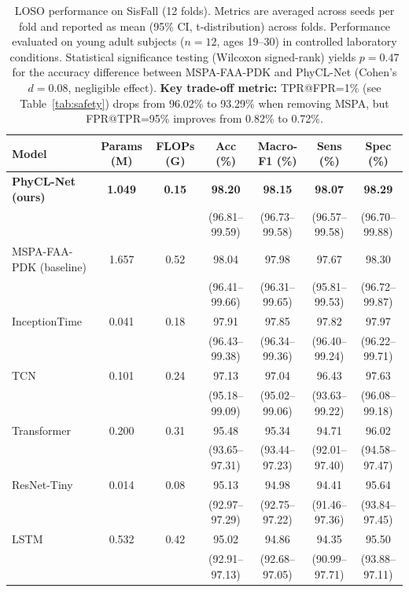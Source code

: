 \documentclass{article}
\begin{document}
\begin{table}[htbp]
\caption{LOSO performance on SisFall (12 folds). Metrics are averaged across seeds per fold and reported as mean (95\% CI, t-distribution) across folds. Performance evaluated on young adult subjects ($n=12$, ages 19--30) in controlled laboratory conditions. Statistical significance testing (Wilcoxon signed-rank) yields $p=0.47$ for the accuracy difference between MSPA-FAA-PDK and PhyCL-Net (Cohen's $d=0.08$, negligible effect). \textbf{Key trade-off metric:} TPR@FPR=1\% (see Table~\ref{tab:safety}) drops from 96.02\% to 93.29\% when removing MSPA, but FPR@TPR=95\% improves from 0.82\% to 0.72\%.}
\label{tab:main_results}
\centering
\small
\begin{tabular}{lcccccc}
\toprule
Model & Params (M) & FLOPs (G) & Acc (\%) & Macro-F1 (\%) & Sens (\%) & Spec (\%) \\
\midrule
\textbf{PhyCL-Net (ours)} & \textbf{1.049} & \textbf{0.15} & \textbf{98.20} & \textbf{98.15} & \textbf{98.07} & \textbf{98.29} \\
 & & & (96.81--99.59) & (96.73--99.58) & (96.57--99.58) & (96.70--99.88) \\
\midrule
MSPA-FAA-PDK (baseline) & 1.657 & 0.52 & 98.04 & 97.98 & 97.67 & 98.30 \\
 & & & (96.41--99.66) & (96.31--99.65) & (95.81--99.53) & (96.72--99.87) \\
\midrule
InceptionTime & 0.041 & 0.18 & 97.91 & 97.85 & 97.82 & 97.97 \\
 & & & (96.43--99.38) & (96.34--99.36) & (96.40--99.24) & (96.22--99.71) \\
\midrule
TCN & 0.101 & 0.24 & 97.13 & 97.04 & 96.43 & 97.63 \\
 & & & (95.18--99.09) & (95.02--99.06) & (93.63--99.22) & (96.08--99.18) \\
\midrule
Transformer & 0.200 & 0.31 & 95.48 & 95.34 & 94.71 & 96.02 \\
 & & & (93.65--97.31) & (93.44--97.23) & (92.01--97.40) & (94.58--97.47) \\
\midrule
ResNet-Tiny & 0.014 & 0.08 & 95.13 & 94.98 & 94.41 & 95.64 \\
 & & & (92.97--97.29) & (92.75--97.22) & (91.46--97.36) & (93.84--97.45) \\
\midrule
LSTM & 0.532 & 0.42 & 95.02 & 94.86 & 94.35 & 95.50 \\
 & & & (92.91--97.13) & (92.68--97.05) & (90.99--97.71) & (93.88--97.11) \\
\bottomrule
\end{tabular}
\end{table}
\end{document}
